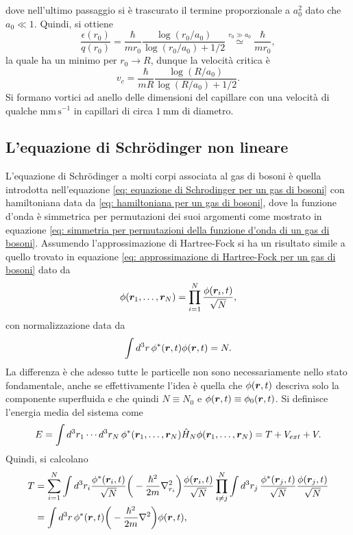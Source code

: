dove nell'ultimo passaggio si è trascurato il termine proporzionale a $a_0^2$ dato che $a_0 \ll 1$. Quindi, si ottiene
\begin{equation}
    \frac{\epsilon(r_0)}{q(r_0)} = \frac{\hbar}{mr_0}\frac{\log{(r_0/a_0)}}{\log{(r_0/a_0)} + 1/2} \overset{r_0 \gg a_0}{\simeq} \frac{\hbar}{mr_0},
\end{equation}
la quale ha un minimo per $r_0 \to R$, dunque la velocità critica è
\begin{equation}
    v_c = \frac{\hbar}{mR}\frac{\log{(R/a_0)}}{\log{(R/a_0)} + 1/2}.
\end{equation}
Si formano vortici ad anello delle dimensioni del capillare con una velocità di qualche $\mathrm{mm\,s^{-1}}$ in capillari di circa $\SI{1}{\milli\meter}$ di diametro. 

\subsection{L'equazione di Schr\"odinger non lineare}
L'equazione di Schr\"odinger a molti corpi associata al gas di bosoni è quella introdotta nell'equazione \eqref{eq: equazione di Schrodinger per un gas di bosoni} con hamiltoniana data da \eqref{eq: hamiltoniana per un gas di bosoni}, dove la funzione d'onda è simmetrica per permutazioni dei suoi argomenti come mostrato in equazione \eqref{eq: simmetria per permutazioni della funzione d'onda di un gas di bosoni}. Assumendo l'approssimazione di Hartree-Fock si ha un risultato simile a quello trovato in equazione \eqref{eq: approssimazione di Hartree-Fock per un gas di bosoni} dato da
\begin{equation}
    \phi(\bm{r}_1,\dots,\bm{r}_N) = \prod_{i=1}^N \frac{\phi(\bm{r}_i,t)}{\sqrt{N}},
\end{equation}
con normalizzazione data da
\begin{equation}
    \int d^3r\,\phi^*(\bm{r},t)\phi(\bm{r},t) = N.
\end{equation}
La differenza è che adesso tutte le particelle non sono necessariamente nello stato fondamentale, anche se effettivamente l'idea è quella che $\phi(\bm{r},t)$ descriva solo la componente superfluida e che quindi $N \equiv N_0$ e $\phi(\bm{r},t) \equiv \phi_0(\bm{r},t)$. Si definisce l'energia media del sistema come
\begin{equation}
    E = \int d^3r_1\cdots d^3r_N\,\phi^*(\bm{r}_1,\dots,\bm{r}_N)\hat{H}_N\phi(\bm{r}_1,\dots,\bm{r}_N) = T + V_{ext} + V.
\end{equation}
Quindi, si calcolano 
\begin{equation}
    \begin{split}
        T &= \sum_{i=1}^N \int d^3r_i \frac{\phi^*(\bm{r}_i,t)}{\sqrt{N}}\bigg(-\frac{\hbar^2}{2m}\nabla_{r_i}^2\bigg)\frac{\phi(\bm{r}_i,t)}{\sqrt{N}}\prod_{i\neq j}^N\int d^3r_j\,\frac{\phi^*(\bm{r}_j,t)}{\sqrt{N}}\frac{\phi(\bm{r}_j,t)}{\sqrt{N}} \\
        &= \int d^3r\,\phi^*(\bm{r},t)\bigg(-\frac{\hbar^2}{2m}\nabla^2\bigg)\phi(\bm{r},t),
    \end{split}
\end{equation}
